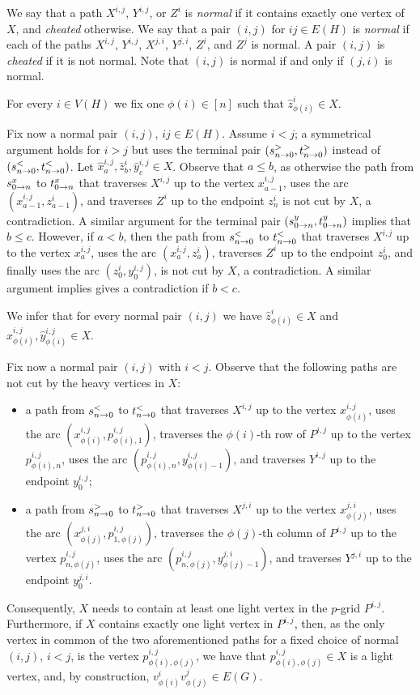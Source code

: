 We say that a path $X^{i,j}$, $Y^{i,j}$, or $Z^i$ is \emph{normal}
if it contains exactly one vertex of $X$, and \emph{cheated}
otherwise.
We say that a pair $(i,j)$ for $ij \in E(H)$ is \emph{normal}
if each of the paths $X^{i,j}$, $Y^{i,j}$, $X^{j,i}$, $Y^{j,i}$, 
$Z^i$, and $Z^j$ is normal.
A pair $(i,j)$ is \emph{cheated} if it is not normal.
Note that $(i,j)$ is normal if and only if $(j,i)$ is normal.

For every $i \in V(H)$ we fix one $\phi(i) \in [n]$ such that
$\hat{z}^i_{\phi(i)} \in X$.

Fix now a normal pair $(i,j)$, $ij \in E(H)$.
Assume $i < j$; a symmetrical argument holds for $i > j$ but uses the terminal pair $(s_{n \to 0}^{>},t_{n \to 0}^{>})$
instead of $(s_{n \to 0}^{<},t_{n \to 0}^{<})$. Let $\hat{x}^{i,j}_a, \hat{z}^i_b, \hat{y}^{i,j}_c \in X$. 
Observe that $a \leq b$, as otherwise the path from $s_{0 \to n}^{x}$ to $t_{0 \to n}^{x}$ that traverses $X^{i,j}$ up to the vertex $x^{i,j}_{a-1}$, uses the arc $(x^{i,j}_{a-1},z^i_{a-1})$, and traverses $Z^i$ up to the endpoint $z^i_n$ is not cut by $X$, a contradiction.
A similar argument for the terminal pair $(s_{0 \to n}^{y},t_{0 \to n}^{y})$ implies that $b \leq c$.
However, if $a < b$, then the path from $s_{n \to 0}^{<}$ to $t_{n \to 0}^{<}$ that traverses $X^{i,j}$ up to the vertex $x^{i,j}_a$, uses the arc
$(x^{i,j}_a,z^i_a)$, traverses $Z^i$ up to the endpoint $z^i_0$, and finally uses the arc $(z^i_0,y^{i,j}_0)$, is not cut by $X$,
a contradiction. A similar argument implies gives a contradiction if $b < c$.

We infer that for every normal pair $(i,j)$ we have $\hat{z}^i_{\phi(i)} \in X$ and
$\hat{x}^{i,j}_{\phi(i)},\hat{y}^{i,j}_{\phi(i)} \in X$.

Fix now a normal pair $(i,j)$ with $i < j$. Observe that the following paths are not cut by the heavy vertices in $X$:
\begin{itemize}
\item a path from $s_{n \to 0}^{<}$ to $t_{n \to 0}^{<}$
that traverses $X^{i,j}$ up to the vertex $x^{i,j}_{\phi(i)}$, uses the arc $(x^{i,j}_{\phi(i)},p^{i,j}_{\phi(i),1})$,
traverses the $\phi(i)$-th row of $P^{i,j}$ up to the vertex $p^{i,j}_{\phi(i),n}$, uses the arc $(p^{i,j}_{\phi(i),n}, y^{i,j}_{\phi(i)-1})$, and traverses $Y^{i,j}$ up to the endpoint $y^{i,j}_0$;
\item a path from $s_{n \to 0}^{>}$ to $t_{n \to 0}^{>}$
that traverses $X^{j,i}$ up to the vertex $x^{j,i}_{\phi(j)}$, uses the arc $(x^{j,i}_{\phi(j)},p^{i,j}_{1,\phi(j)})$,
traverses the $\phi(j)$-th column of $P^{i,j}$ up to the vertex $p^{i,j}_{n,\phi(j)}$, uses the arc $(p^{i,j}_{n,\phi(j)}, y^{j,i}_{\phi(j)-1})$, and traverses $Y^{j,i}$ up to the endpoint $y^{j,i}_0$.
\end{itemize}
Consequently, $X$ needs to contain at least one light vertex in the $p$-grid
$P^{i,j}$.
Furthermore, if $X$ contains exactly one light vertex in $P^{i,j}$,
then, as the only vertex in common of the two aforementioned paths for a fixed choice of normal $(i,j)$, $i < j$, is the vertex $p^{i,j}_{\phi(i),\phi(j)}$,
we have that $p^{i,j}_{\phi(i),\phi(j)} \in X$ is a light vertex, and, by construction, $v^i_{\phi(i)} v^j_{\phi(j)} \in E(G)$.

